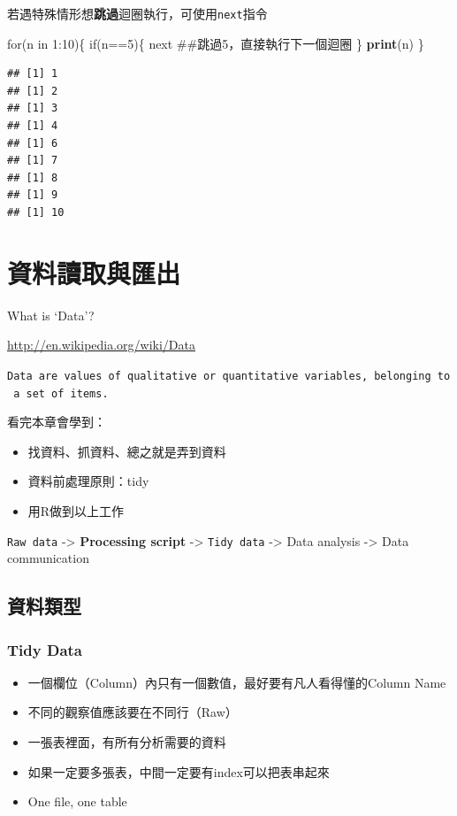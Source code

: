 \documentclass[]{book}
\newenvironment{Shaded}{\begin{snugshade}}{\end{snugshade}}
\newcommand{\KeywordTok}[1]{\textcolor[rgb]{0.13,0.29,0.53}{\textbf{{#1}}}}
\newcommand{\DecValTok}[1]{\textcolor[rgb]{0.00,0.00,0.81}{{#1}}}
\newcommand{\NormalTok}[1]{{#1}}
\providecommand{\tightlist}{%
  \setlength{\itemsep}{0pt}\setlength{\parskip}{0pt}}
\theoremstyle{definition}
\theoremstyle{definition}
\theoremstyle{remark}
\begin{document}
若遇特殊情形想\textbf{跳過}迴圈執行，可使用\texttt{next}指令

\begin{Shaded}
\begin{Highlighting}[]
\NormalTok{for(n in }\DecValTok{1}\NormalTok{:}\DecValTok{10}\NormalTok{)\{}
  \NormalTok{if(n==}\DecValTok{5}\NormalTok{)\{}
    \NormalTok{next ##跳過5，直接執行下一個迴圈}
  \NormalTok{\}}
  \KeywordTok{print}\NormalTok{(n)}
\NormalTok{\}}
\end{Highlighting}
\end{Shaded}

\begin{verbatim}
## [1] 1
## [1] 2
## [1] 3
## [1] 4
## [1] 6
## [1] 7
## [1] 8
## [1] 9
## [1] 10
\end{verbatim}

\chapter{資料讀取與匯出}\label{io}

What is `Data'?

\url{http://en.wikipedia.org/wiki/Data}

\texttt{Data\ are\ values\ of\ qualitative\ or\ quantitative\ variables,\ belonging\ to\ a\ set\ of\ items.}

看完本章會學到：

\begin{itemize}
\tightlist
\item
  找資料、抓資料、總之就是弄到資料
\item
  資料前處理原則：tidy
\item
  用R做到以上工作
\end{itemize}

\texttt{Raw\ data} -\textgreater{} \textbf{Processing script}
-\textgreater{} \texttt{Tidy\ data} -\textgreater{} Data analysis
-\textgreater{} Data communication

\section{資料類型}

\subsection{Tidy Data}\label{tidy-data}

\begin{itemize}
\tightlist
\item
  一個欄位（Column）內只有一個數值，最好要有凡人看得懂的Column Name
\item
  不同的觀察值應該要在不同行（Raw）
\item
  一張表裡面，有所有分析需要的資料
\item
  如果一定要多張表，中間一定要有index可以把表串起來
\item
  One file, one table
\end{itemize}
\end{document}

